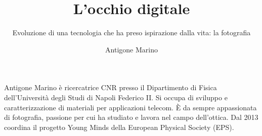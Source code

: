 ﻿\title{L'occhio digitale}
\subtitle{Evoluzione di una tecnologia che ha preso ispirazione dalla vita: la fotografia}
\suptitle{\phantom{x}}
\author{Antigone Marino}
\maketitle
\begin{small}
\pichskip{4mm}
\nobalance



\vfill
\begin{thebiography}{}%
Antigone Marino è ricercatrice CNR presso il Dipartimento di Fisica dell'Università degli Studi di Napoli Federico II. Si occupa di sviluppo e caratterizzazione di materiali per applicazioni telecom. È da sempre appassionata di fotografia, passione per cui ha studiato e lavora nel campo dell'ottica. Dal 2013 coordina il progetto Young Minds della European Physical Society (EPS).
\end{thebiography}
\end{small}

